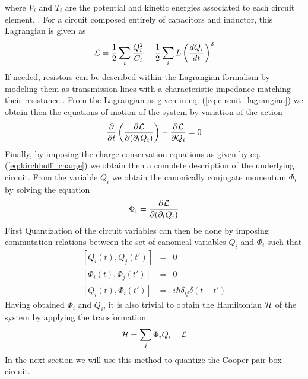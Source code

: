 %
where $V_i$ and $T_i$ are the potential and kinetic energies associated to each circuit element. . For a circuit composed entirely of capacitors and inductor, this Lagrangian is given as
%
\begin{equation}
\begin{mathcal}L\end{mathcal} = \frac{1}{2}\sum\limits_i \frac{Q_i^2}{C_i}-\frac{1}{2}\sum\limits_i L \left( \frac{dQ_i}{dt}\right)^2 \label{eq:circuit_lagrangian}
\end{equation}
%
If needed, resistors can be described within the Lagrangian formalism by modeling them as transmission lines with a characteristic impedance matching their resistance \citep{yurke_quantum_1984}. From the Lagrangian as given in eq. (\ref{eq:circuit_lagrangian}) we obtain then the equations of motion of the system by variation of the action
%
\begin{equation}
\frac{\partial}{\partial t}\left( \frac{\partial \begin{mathcal}L\end{mathcal}}{\partial(\partial_t Q_i)}\right)-\frac{\partial \begin{mathcal}L\end{mathcal}}{\partial Q_i} = 0
\end{equation}
%
Finally, by imposing the charge-conservation equations as given by eq. (\ref{eq:kirchhoff_charge}) we obtain then a complete description of the underlying circuit. From the variable $Q_i$ we obtain the canonically conjugate momentum $\Phi_i$ by solving the equation
%
\begin{equation}
\Phi_i = \frac{\partial \begin{mathcal}L\end{mathcal}}{\partial(\partial_t Q_i)}
\end{equation}
%
First Quantization of the circuit variables can then be done by imposing commutation relations between the set of canonical variables $Q_i$ and $\Phi_i$ such that
%
\begin{eqnarray}
\left[Q_i(t),Q_j(t')\right] & = & 0 \\
\left[\Phi_i(t),\Phi_j(t') \right] & = & 0 \\
\left[Q_i(t),\Phi_i(t')\right] & = & i\hbar\delta_{ij}\delta(t-t') \label{eq:quantization_commutation_relations}
\end{eqnarray}
%
Having obtained $\Phi_i$ and $Q_i$, it is also trivial to obtain the Hamiltonian $\begin{mathcal}H\end{mathcal}$ of the system by applying the transformation
%
\begin{equation}
\begin{mathcal}H\end{mathcal} = \sum\limits_j \Phi_i \dot{Q}_i - \begin{mathcal}L\end{mathcal}
\end{equation}
%
In the next section we will use this method to quantize the Cooper pair box circuit.

